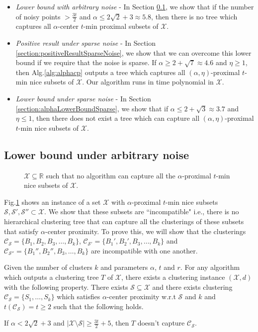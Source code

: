 \documentclass[anon,12pt]{colt2016} %
\newcommand{\mc}{\mathcal}
\begin{document}
\begin{itemize}
\item {\it Lower bound with arbitrary noise} - In Section \ref{section:alphaLowerBoundArbitrary}, we show that if the number of noisy points $> \frac{3t}{2}$ and $\alpha \le 2\sqrt{2} + 3 \approx 5.8$, then there is no tree which captures all $\alpha$-center $t$-min proximal subsets of $\mc X$.
\item  {\it Positive result under sparse noise} - In Section \ref{section:positiveResultSparseNoise}, we show that we can overcome this lower bound if we require that the noise is sparse. If $\alpha \ge 2 + \sqrt{7} \approx 4.6$ and $\eta \ge 1$, then Alg.\ref{alg:alphacp} outputs a tree which captures all $(\alpha, \eta)$-proximal $t$-min nice subsets of $\mc X$. Our algorithm runs in time polynomial in $\mc X$. 
\item  {\it Lower bound under sparse noise} - In Section \ref{section:alphaLowerBoundSparse}, we show that if $\alpha \le 2 + \sqrt{3} \approx 3.7$ and $\eta \le 1$, then there does not exist a tree which can capture all $(\alpha, \eta)$-proximal $t$-min nice subsets of $\mc X$.
\end{itemize} 

\subsection{Lower bound under arbitrary noise}
\label{section:alphaLowerBoundArbitrary}

\begin{figure}

\caption{$\mc X \subseteq \mathbb{R}$ such that no algorithm can capture all the $\alpha$-proximal $t$-min nice subsets of $\mc X$. } 
\label{fig:nosparsealg}
\end{figure}

Fig.\ref{fig:nosparsealg} shows an instance of a set $\mc X$ with $\alpha$-proximal $t$-min nice subsets $\mc S, \mc S', \mc S'' \subset \mc X$. We show that these subsets are ``incompatible" i.e., there is no  hierarchical clustering tree that can capture all the clusterings of these subsets that satisfy $\alpha$-center proximity. To prove this, we will show that the clusterings $\mc C_{\mc S} = \{B_1, B_2, B_3, \ldots, B_k\}$, $\mc C_{\mc S'} = \{B_1', B_2', B_3, \ldots, B_k\}$ and $\mc C_{\mc S''} = \{B_1'', B_2'', B_3, \ldots, B_k\}$ are incompatible with one another.

\begin{theorem}
\label{thm:nosparsealg}
Given the number of clusters $k$ and parameters $\alpha$, $t$ and $r$. For any algorithm which outputs a clustering tree $T$ of $\mc X$, there exists a clustering instance $(\mc X, d)$ with the following property. There exists $\mc S \subseteq \mc X$ and there exists clustering $\mc C_{\mc S} = \{S_1, \ldots, S_k\}$ which satisfies $\alpha$-center proximity w.r.t $\mc S$ and $k$ and $ t(\mc C_{\mc S}) = t \ge 2$ such that the following holds. 

If $\alpha < 2\sqrt 2 + 3$ and $|\mc X \setminus \mc S| \ge \frac{3t}{2}+5$, then $T$ doesn't capture $\mc C_{\mc S}$.
\end{theorem}
\end{document}
